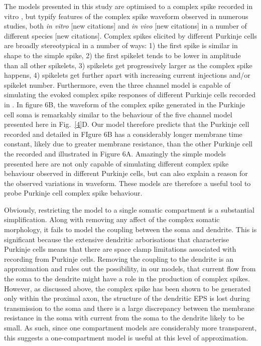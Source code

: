 \documentclass[utf8]{frontiersSCNS} %
\begin{document}
The models presented in this study are optimised to a complex spike recorded in vitro \cite{DavieEtAl2008}, but typify features of the complex spike waveform observed in numerous studies, both \textsl{in vitro} [new citations] and \textsl{in vivo} [new citations] in a number of different species [new citations]. Complex spikes elicited by different Purkinje cells are broadly stereotypical in a number of ways: 1) the first spike is similar in shape to the simple spike, 2) the first spikelet tends to be lower in amplitude than all other spikelets, 3) spikelets get progressively larger as the complex spike happens, 4) spikelets get further apart with increasing current injections and/or spikelet number. Furthermore, even the three channel model is capable of simulating the evoked complex spike responses of different Purkinje cells recorded in \cite{MonsivaisEtAl2005}. In figure 6B, the waveform of the complex spike generated in the Purkinje cell soma is remarkably similar to the behaviour of the five channel model presented here in Fig.~\ref{4}D. Our model therefore predicts that the Purkinje cell recorded \cite{MonsivaisEtAl2005} and detailed in FIgure 6B has a considerably longer membrane time constant, likely due to greater membrane resistance, than the other Purkinje cell the recorded and illustrated in Figure 6A. Amazingly the simple models presented here are not only capable of simulating different complex spike behaviour  observed in different Purkinje cells, but can also explain a reason for the observed variations in waveform. These models are therefore a useful tool to probe Purkinje cell complex spike behaviour.

Obviously, restricting the model to a single somatic compartment is a substantial simplification. Along with removing any affect of the complex somatic morphology, it fails to model the coupling between the soma and dendrite. This is significant because the extensive dendritic arborisations that characterise Purkinje cells means that there are space clamp limitations associated with recording from Purkinje cells. Removing the coupling to the dendrite is an approximation and rules out the possibility, in our models, that current flow from the soma to the dendrite might have a role in the production of complex spikes. However, as discussed above, the complex spike has been shown to be generated only within the proximal axon, the structure of the dendritic EPS is lost during transmission to the soma and there is a large discrepancy between the membrane resistance in the soma with current from the soma to the dendrite likely to be small. As such, since one compartment models are considerably more transparent, this suggests a one-compartment model is useful at this level of approximation.
\end{document}
